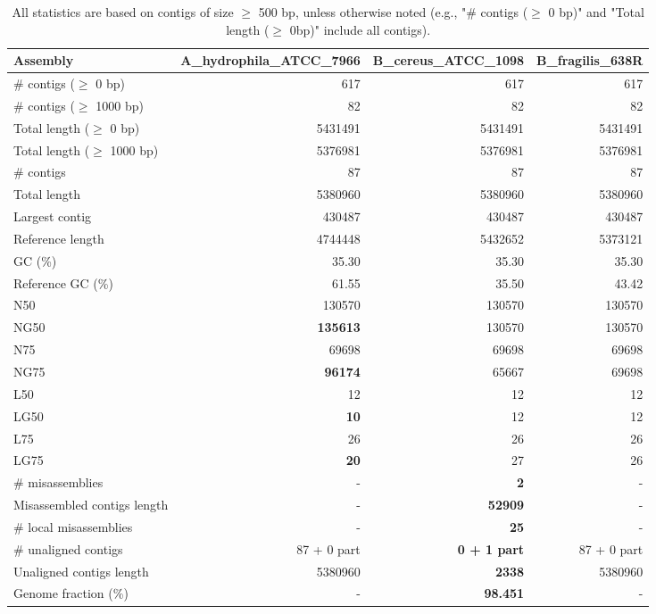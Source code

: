 \documentclass[12pt,a4paper]{article}
\begin{document}
\begin{table}[ht]
\begin{center}
\caption{All statistics are based on contigs of size $\geq$ 500 bp, unless otherwise noted (e.g., "\# contigs ($\geq$ 0 bp)" and "Total length ($\geq$ 0bp)" include all contigs).}
\begin{tabular}{|l*{3}{|r}|}
\hline
Assembly & A\_hydrophila\_ATCC\_7966 & B\_cereus\_ATCC\_1098 & B\_fragilis\_638R \\ \hline
\# contigs ($\geq$ 0 bp) & 617 & 617 & 617 \\ \hline
\# contigs ($\geq$ 1000 bp) & 82 & 82 & 82 \\ \hline
Total length ($\geq$ 0 bp) & 5431491 & 5431491 & 5431491 \\ \hline
Total length ($\geq$ 1000 bp) & 5376981 & 5376981 & 5376981 \\ \hline
\# contigs & 87 & 87 & 87 \\ \hline
Total length & 5380960 & 5380960 & 5380960 \\ \hline
Largest contig & 430487 & 430487 & 430487 \\ \hline
Reference length & 4744448 & 5432652 & 5373121 \\ \hline
GC (\%) & 35.30 & 35.30 & 35.30 \\ \hline
Reference GC (\%) & 61.55 & 35.50 & 43.42 \\ \hline
N50 & 130570 & 130570 & 130570 \\ \hline
NG50 & {\bf 135613} & 130570 & 130570 \\ \hline
N75 & 69698 & 69698 & 69698 \\ \hline
NG75 & {\bf 96174} & 65667 & 69698 \\ \hline
L50 & 12 & 12 & 12 \\ \hline
LG50 & {\bf 10} & 12 & 12 \\ \hline
L75 & 26 & 26 & 26 \\ \hline
LG75 & {\bf 20} & 27 & 26 \\ \hline
\# misassemblies & - & {\bf 2} & - \\ \hline
Misassembled contigs length & - & {\bf 52909} & - \\ \hline
\# local misassemblies & - & {\bf 25} & - \\ \hline
\# unaligned contigs & 87 + 0 part & {\bf 0 + 1 part} & 87 + 0 part \\ \hline
Unaligned contigs length & 5380960 & {\bf 2338} & 5380960 \\ \hline
Genome fraction (\%) & - & {\bf 98.451} & - \\ \hline

\end{tabular}
\end{center}
\end{table}
\end{document}
